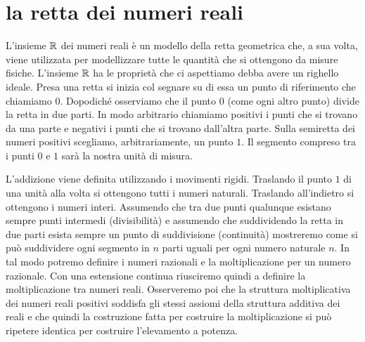 \section{la retta dei numeri reali}
\label{sec:reali}

L'insieme ${\mathbb R}$ dei numeri reali è un modello della retta geometrica che,
a sua volta, viene utilizzata per modellizzare tutte le quantità che si ottengono
da misure fisiche.
L'insieme ${\mathbb R}$ ha le proprietà che ci aspettiamo debba avere un righello ideale.
Presa una retta si inizia col segnare
su di essa un punto di riferimento che chiamiamo $0$. Dopodiché osserviamo che
il punto $0$ (come ogni altro punto) divide la retta in due parti. In modo arbitrario
chiamiamo positivi i punti che si trovano da una parte e negativi i punti che
si trovano dall'altra parte. Sulla semiretta dei numeri positivi scegliamo, arbitrariamente,
un punto $1$. Il segmento compreso tra i punti $0$ e $1$ sarà la nostra unità di
misura.

L'addizione viene definita utilizzando i movimenti rigidi.
Traslando il punto $1$ di una unità alla volta si ottengono tutti i numeri naturali.
Traslando all'indietro si ottengono i numeri interi. 
Assumendo che tra due punti qualunque esistano sempre punti intermedi (divisibilità) e
assumendo che suddividendo la retta in due parti esista sempre un punto di 
suddivisione (continuità) mostreremo come si può suddividere 
ogni segmento in $n$ parti uguali per ogni numero naturale $n$. 
In tal modo potremo definire i numeri razionali e la moltiplicazione per un numero razionale.
Con una estensione continua riusciremo quindi a definire la moltiplicazione 
tra numeri reali. 
Osserveremo poi che la struttura moltiplicativa dei numeri reali positivi soddisfa 
gli stessi assiomi della struttura additiva dei reali e che quindi la costruzione fatta 
per costruire la moltiplicazione si può ripetere identica per costruire l'elevamento a potenza.


